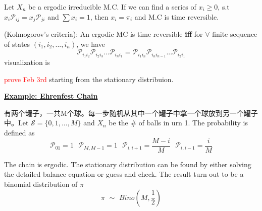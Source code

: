 \documentclass[10.5pt]{article}
\newcommand{\prob}[0]{\mathcal{P}}
\newcommand{\hilight}[1]{\colorbox{orange!20}{#1}}
\newenvironment{changemargin}[2]{%
  \begin{list}{}{%
    \setlength{\topsep}{0pt}%
    \setlength{\leftmargin}{#1}%
    \setlength{\rightmargin}{#2}%
    \setlength{\listparindent}{\parindent}%
    \setlength{\itemindent}{\parindent}%
    \setlength{\parsep}{\parskip}%
  }%
  \item[]}{\end{list}}
\begin{document}
\begin{changemargin}{-0.125in}{0in}
\begin{enumerate}
       \begin{proposition}
       	Let $X_n$ be a \hilight{ergodic irreducible} M.C. If we can find a series of $x_i \geq 0$, s.t $x_i \prob_{ij} = x_j \prob_{ji}$ and $\sum x_i = 1$, then $x_i = \pi_i$ and M.C is time reversible.
       \end{proposition}
       
       \begin{proposition}
       	(Kolmogorov's criteria): An ergodic MC is time reversible \textbf{iff} for $\forall$ finite sequence of states $(i_1, i_2,...,i_n)$, we have 
       	\[
        \prob_{i_1i_2} \prob_{i_2i_3}... \prob_{i_ni_1} =  \prob_{i_1i_n}  \prob_{i_ni_{n-1}}... \prob_{i_2i_1}
       	\]
       	visualization is 
       	\begin{center}
      	
       \end{center}
       \end{proposition}
       
       \textcolor{red}{prove Feb 3rd} starting from the stationary distribuion. 
       
       \medskip
       
       \underline{\textbf{Example: Ehrenfest Chain}}
       
       \smallskip
       
       有两个罐子，一共M个球。每一步随机从其中一个罐子中拿一个球放到另一个罐子中。Let $\mathcal{S} = \{0,1,...,M\}$ and $X_n$ be the \# of balls in urn 1. The probability is defined as 
       \[
       \prob_{01} = 1\,\,\,\,\prob_{M,M-1} = 1\,\,\,\,\prob_{i, i+1} = \frac{M - i}{M}\,\,\,\,\prob_{i, i-1} = \frac{i}{M}
       \]
      
        The chain is ergodic. The stationary distribution can be found by either solving the detailed balance equation or guess and check. The result turn out to be a binomial distribution of $\pi$
        \[
        \pi \,\,\sim \,\, Bino(M, \frac{1}{2})
        \]
        

\end{enumerate}
\end{changemargin}
\end{document}
